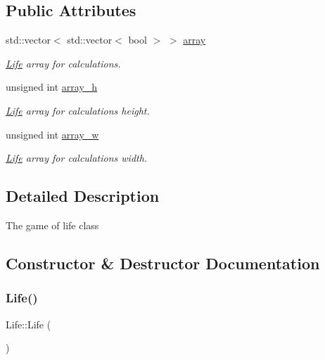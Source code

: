 \subsection*{Public Attributes}
\begin{DoxyCompactItemize}
\item 
\mbox{\label{class_life_a4fa70771b707df0c393642c512f53330}} 
std\+::vector$<$ std\+::vector$<$ bool $>$ $>$ \mbox{\hyperlink{class_life_a4fa70771b707df0c393642c512f53330}{array}}
\begin{DoxyCompactList}\small\item\em \mbox{\hyperlink{class_life}{Life}} array for calculations. \end{DoxyCompactList}\item 
\mbox{\label{class_life_af9a2a9e5d8136e921282c496b1bf6134}} 
unsigned int \mbox{\hyperlink{class_life_af9a2a9e5d8136e921282c496b1bf6134}{array\+\_\+h}}
\begin{DoxyCompactList}\small\item\em \mbox{\hyperlink{class_life}{Life}} array for calculations height. \end{DoxyCompactList}\item 
\mbox{\label{class_life_a69fccf41d3aaa8c80bac89fb9169d410}} 
unsigned int \mbox{\hyperlink{class_life_a69fccf41d3aaa8c80bac89fb9169d410}{array\+\_\+w}}
\begin{DoxyCompactList}\small\item\em \mbox{\hyperlink{class_life}{Life}} array for calculations width. \end{DoxyCompactList}\end{DoxyCompactItemize}


\subsection{Detailed Description}
The game of life class 

\subsection{Constructor \& Destructor Documentation}
\mbox{\label{class_life_a6de2a371f6f778f8b4938d219390b746}} 
\subsubsection{\texorpdfstring{Life()}{Life()}\hspace{0.1cm}{\footnotesize\ttfamily [1/2]}}
{\footnotesize\ttfamily Life\+::\+Life (\begin{DoxyParamCaption}{ }\end{DoxyParamCaption})}




